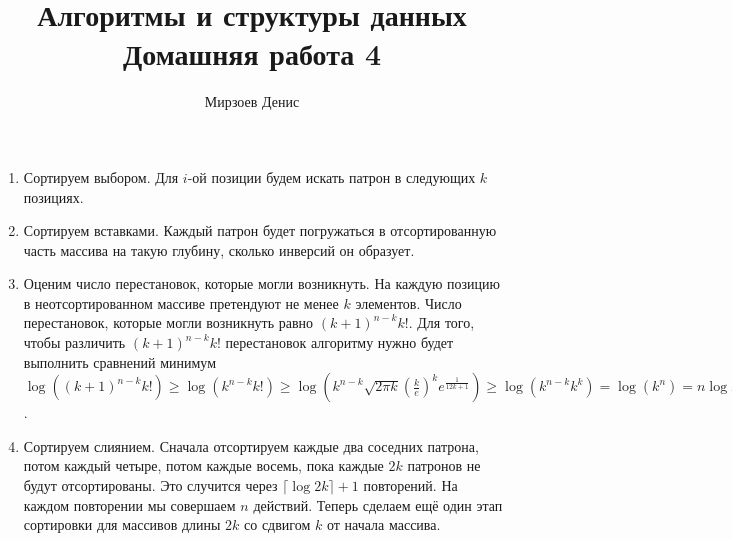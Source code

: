 \documentclass{article}
\title{Алгоритмы и структуры данных\\Домашняя работа 4}
\author{Мирзоев Денис}
\date{}
\begin{document}
\maketitle

\section{}

\begin{enumerate}[label=(\alph*)]
    \item Сортируем выбором. Для $i$-ой позиции будем искать патрон в следующих
        $k$ позициях.

    \item Сортируем вставками. Каждый патрон будет погружаться в
        отсортированную часть массива на такую глубину, сколько инверсий он
        образует.

    \item Оценим число перестановок, которые могли возникнуть. На каждую
        позицию в неотсортированном массиве претендуют не менее $k$ элементов.
        Число перестановок, которые могли возникнуть равно $(k+1)^{n-k}k!$.
        Для того, чтобы различить $(k+1)^{n-k}k!$ перестановок алгоритму нужно
        будет выполнить сравнений минимум $\log((k+1)^{n-k}k!)\geq\log(k^{n-k}k!)
        \geq\log(k^{n-k}\sqrt{2\pi k}(\frac{k}{e})^ke^{\frac{1}{12k+1}})
        \geq\log(k^{n-k}k^k) = \log(k^n) = n\log k =\Omega(n\log k)$.

    \item Сортируем слиянием. Сначала отсортируем каждые два соседних патрона,
        потом каждый четыре, потом каждые восемь, пока каждые $2k$ патронов не
        будут отсортированы. Это случится через $\lceil\log 2k\rceil + 1$
        повторений. На каждом повторении мы совершаем $n$ действий. Теперь
        сделаем ещё один этап сортировки для массивов длины $2k$ со сдвигом $k$
        от начала массива.

\end{enumerate}

\section{}
\end{document}
